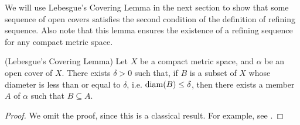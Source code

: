\documentclass[12pt,twoside,draft]{book}
\begin{document}
We will use Lebesgue's Covering Lemma in the next section to show that some sequence of open covers satisfies the second condition of the definition of refining sequence.
Also note that this lemma ensures the existence of a refining sequence for any compact metric space.
\begin{lemma}
  (Lebesgue's Covering Lemma)
  Let $X$ be a compact metric space, and $\alpha$ be an open cover of $X$.
  There exists $\delta > 0$ such that, if $B$ is a subset of $X$ whose diameter is less than or equal to $\delta$, i.e. $\mathrm{diam}(B) \leq \delta$, then there exists a member $A$ of $\alpha$ such that $B \subseteq A$.
  \label{lem:covering}
  \begin{proof}
    We omit the proof, since this is a classical result.
    For example, see \citet{royden}.
  \end{proof}
\end{lemma}
\end{document}
